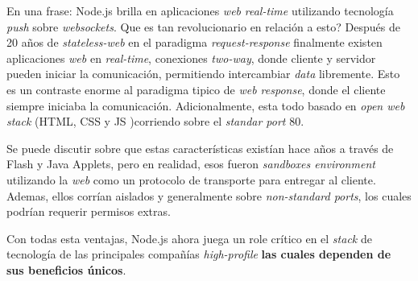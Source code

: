 
En una frase: Node.js brilla en aplicaciones \textit{web} \textit{real-time} utilizando tecnología \textit{push} sobre \textit{websockets}. Que es tan revolucionario en relación a esto? Después de 20 años de \textit{stateless-web} en el paradigma \textit{request-response} finalmente existen aplicaciones \textit{web} en \textit{real-time}, conexiones \textit{two-way}, donde cliente y servidor pueden iniciar la comunicación, permitiendo intercambiar \textit{data} libremente. Esto es un contraste enorme al paradigma tipico de \textit{web response}, donde el cliente siempre iniciaba la comunicación. Adicionalmente, esta todo basado en \textit{open web stack} (HTML, CSS y JS )corriendo sobre el \textit{standar port} 80.

Se puede discutir sobre que estas características existían hace años a través de Flash y Java Applets, pero en realidad, esos fueron \textit{sandboxes environment} utilizando la \textit{web} como un protocolo de transporte para entregar al cliente. Ademas, ellos corrían aislados y generalmente sobre \textit{non-standard ports}, los cuales podrían requerir permisos extras.

Con todas esta ventajas, Node.js ahora juega un role crítico en el \textit{stack} de tecnología de las principales compañías \textit{high-profile}\cite{online_nodejs_highprofilecompanies} \textbf{las cuales dependen de sus beneficios únicos}.

